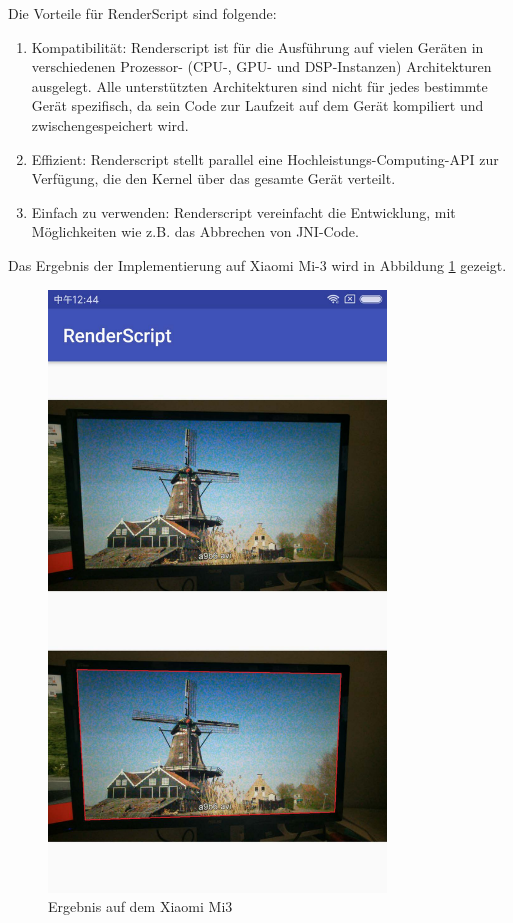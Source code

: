 Die Vorteile für RenderScript sind folgende:
\begin{enumerate}
 \item Kompatibilität: Renderscript ist für die Ausführung auf vielen Geräten in verschiedenen Prozessor- (CPU-, GPU- und DSP-Instanzen) Architekturen ausgelegt. Alle unterstützten Architekturen sind nicht für jedes bestimmte Gerät spezifisch, da sein Code zur Laufzeit auf dem Gerät kompiliert und zwischengespeichert wird.
 \item Effizient: Renderscript stellt parallel eine Hochleistungs-Computing-API zur Verfügung, die den Kernel über das gesamte Gerät verteilt.
 \item Einfach zu verwenden: Renderscript vereinfacht die Entwicklung, mit Möglichkeiten wie z.B. das Abbrechen von JNI-Code.
\end{enumerate}

Das Ergebnis der Implementierung auf Xiaomi Mi-3 wird in Abbildung \ref{fig:Ergebnis3} gezeigt.

\begin{figure}[H]
 \centering 
  \includegraphics[keepaspectratio,width=0.8\textwidth]{images/5_Implementirung/smartphone.pdf}
 \caption{Ergebnis auf dem Xiaomi Mi3}
 \label{fig:Ergebnis3}
\end{figure}
